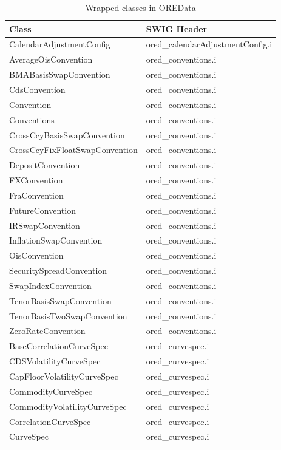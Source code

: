 \documentclass[12pt, a4paper]{report}
\begin{document}
\begin{appendix}
{
\scriptsize
\begin{longtable}{|l|l|}
\caption{Wrapped classes in OREData \\ \vspace{0.5cm}} \\
\hline
Class & SWIG Header \\
\hline
CalendarAdjustmentConfig & ored\_calendarAdjustmentConfig.i \\
AverageOisConvention & ored\_conventions.i \\
BMABasisSwapConvention & ored\_conventions.i \\
CdsConvention & ored\_conventions.i \\
Convention & ored\_conventions.i \\
Conventions & ored\_conventions.i \\
CrossCcyBasisSwapConvention & ored\_conventions.i \\
CrossCcyFixFloatSwapConvention & ored\_conventions.i \\
DepositConvention & ored\_conventions.i \\
FXConvention & ored\_conventions.i \\
FraConvention & ored\_conventions.i \\
FutureConvention & ored\_conventions.i \\
IRSwapConvention & ored\_conventions.i \\
InflationSwapConvention & ored\_conventions.i \\
OisConvention & ored\_conventions.i \\
SecuritySpreadConvention & ored\_conventions.i \\
SwapIndexConvention & ored\_conventions.i \\
TenorBasisSwapConvention & ored\_conventions.i \\
TenorBasisTwoSwapConvention & ored\_conventions.i \\
ZeroRateConvention & ored\_conventions.i \\
BaseCorrelationCurveSpec & ored\_curvespec.i \\
CDSVolatilityCurveSpec & ored\_curvespec.i \\
CapFloorVolatilityCurveSpec & ored\_curvespec.i \\
CommodityCurveSpec & ored\_curvespec.i \\
CommodityVolatilityCurveSpec & ored\_curvespec.i \\
CorrelationCurveSpec & ored\_curvespec.i \\
CurveSpec & ored\_curvespec.i \\

\end{longtable}}
\end{appendix}
\end{document}
